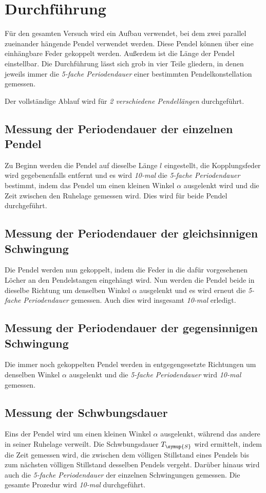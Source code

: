 \section{Durchführung}
\label{sec:Durchführung}
Für den gesamten Versuch wird ein Aufbau verwendet, bei dem zwei parallel zueinander hängende Pendel verwendet werden. Diese Pendel können über
eine einhängbare Feder gekoppelt werden. Außerdem ist die Länge der Pendel einstellbar.
Die Durchführung lässt sich grob in vier Teile gliedern, in denen jeweils immer die \textit{5-fache Periodendauer} einer bestimmten Pendelkonstellation
gemessen.

Der vollständige Ablauf wird für \textit{2 verschiedene Pendellängen} durchgeführt.


\subsection{Messung der Periodendauer der einzelnen Pendel}
Zu Beginn werden die Pendel auf dieselbe Länge $l$ eingestellt, die Kopplungsfeder wird gegebenenfalls entfernt und es wird \textit{10-mal} die 
\textit{5-fache Periodendauer} bestimmt, indem das Pendel um einen kleinen Winkel $\alpha$ ausgelenkt wird und die Zeit zwischen den Ruhelage 
gemessen wird. Dies wird für beide Pendel durchgeführt.

\subsection{Messung der Periodendauer der gleichsinnigen Schwingung}
Die Pendel werden nun gekoppelt, indem die Feder in die dafür vorgesehenen Löcher an den Pendelstangen eingehängt wird. Nun werden die Pendel beide 
in dieselbe Richtung um denselben Winkel $\alpha$ ausgelenkt und es wird erneut die \textit{5-fache Periodendauer} gemessen. Auch dies wird 
insgesamt \textit{10-mal} erledigt.

\subsection{Messung der Periodendauer der gegensinnigen Schwingung}
Die immer noch gekoppelten Pendel werden in entgegengesetzte Richtungen um denselben Winkel $\alpha$ ausgelenkt und die \textit{5-fache Periodendauer}
wird \textit{10-mal} gemessen.

\subsection{Messung der Schwbungsdauer}
Eins der Pendel wird um einen kleinen Winkel $\alpha$ ausgelenkt, während das andere in seiner Ruhelage verweilt. Die Schwbungsdauer $T_{\symup{S}}$ wird
ermittelt, indem die Zeit gemessen wird, die zwischen dem völligen Stillstand eines Pendels bis zum nächsten völligen Stillstand desselben Pendels vergeht.
Darüber hinaus wird auch die \textit{5-fache Periodendauer} der einzelnen Schwingungen gemessen. Die gesamte Prozedur wird \textit{10-mal} durchgeführt.

